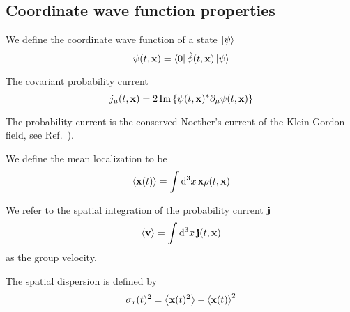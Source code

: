 \subsection{Coordinate wave function properties}

\begin{definition}
	We define the coordinate wave function of a state $\ket{\psi}$
	\begin{equation}
		\psi(t,\vb{x})
		=
		\bra{0}\hat\phi(t,\vb{x})\ket{\psi}
	\end{equation}
\end{definition}
\begin{definition}
	The covariant probability current
	\begin{equation}
		j_\mu(t,\vb{x})
		=
		2
		\operatorname{\operatorname{Im}}\left\{
			\psi(t,\vb{x})^*
			\partial_\mu
			\psi(t,\vb{x})
		\right\}
		\label{eq:qkg_probability_current}
	\end{equation}	
\end{definition}
The probability current is the conserved Noether's current of the Klein-Gordon field, see Ref.~\cite[p.~18]{Peskin1995}).
\begin{definition}[Localization]
	We define the mean localization to be
	\begin{equation}
		\expval{\vb{x}(t)}
		=
		\int\dd[3]{x}
		\vb{x}
		\rho(t,\vb{x})
	\end{equation}
\end{definition}
\begin{definition}
	We refer to the spatial integration of the probability current $\vb{j}$
	\begin{equation}
		\expval{\vb{v}}
		=
		\int\dd[3]{x}
		\vb{j}(t,\vb{x})
		\label{eq:group_velocity}
	\end{equation}
	as the group velocity.
\end{definition}
\begin{definition}
	The spatial dispersion is defined by
	\begin{equation}
		\sigma_x(t)^2
		=
		\expval{\vb{x}(t)^2}
		-
		\expval{\vb{x}(t)}^2		
	\end{equation}
\end{definition}